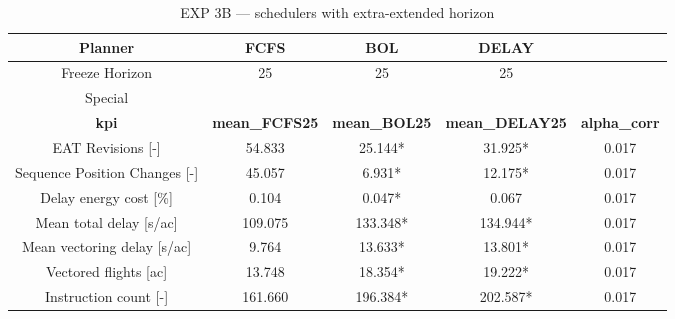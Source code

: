 \begin{table}[htbp]
\caption{EXP 3B — schedulers with extra-extended horizon}
\begin{center}
\footnotesize
\setlength{\tabcolsep}{3pt}
\renewcommand{\arraystretch}{1.000}
\begin{tabular}{|c|c|c|c|c|}
\hline
Planner & FCFS & BOL & DELAY &  \\
\hline
Freeze Horizon & 25 & 25 & 25 &  \\
\hline
Special &  &  &  &  \\
\hline
\textbf{kpi} & \textbf{mean\_FCFS25} & \textbf{mean\_BOL25} & \textbf{mean\_DELAY25} & \textbf{alpha\_corr} \\
\hline
EAT Revisions [-] & 54.833 & 25.144* & 31.925* & 0.017 \\
\hline
Sequence Position Changes [-] & 45.057 & 6.931* & 12.175* & 0.017 \\
\hline
Delay energy cost [\%] & 0.104 & 0.047* & 0.067 & 0.017 \\
\hline
Mean total delay [s/ac] & 109.075 & 133.348* & 134.944* & 0.017 \\
\hline
Mean vectoring delay [s/ac] & 9.764 & 13.633* & 13.801* & 0.017 \\
\hline
Vectored flights [ac] & 13.748 & 18.354* & 19.222* & 0.017 \\
\hline
Instruction count [-] & 161.660 & 196.384* & 202.587* & 0.017 \\
\hline
\end{tabular}
\label{tab:exp\_3b\_schedulers\_with\_extra-extended\_horizon}
\end{center}
\end{table}